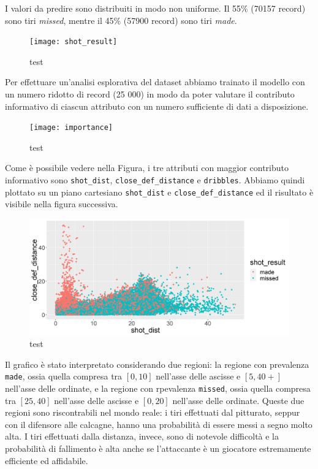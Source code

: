 \par
I valori da predire sono distribuiti in modo non uniforme. Il 55\% (70157 record) sono tiri \textit{missed}, mentre il 45\% (57900 record) sono tiri \textit{made}.

\begin{figure}
\caption{test}
\fontsize{9pt}{1em}
	\texttt{[image: shot\_result]}
\end{figure}

\par
Per effettuare un'analisi esplorativa del dataset abbiamo trainato il modello con un numero ridotto di record (25 000) in modo da poter valutare il contributo informativo di ciascun attributo con un numero sufficiente di dati a disposizione.

\begin{figure}
\caption{test}
\fontsize{9pt}{1em}
	\texttt{[image: importance]}
\end{figure}

\par
Come è possibile vedere nella Figura, i tre attributi con maggior contributo informativo sono \texttt{shot\_dist}, \texttt{close\_def\_distance} e \texttt{dribbles}. Abbiamo quindi plottato su un piano cartesiano \texttt{shot\_dist} e \texttt{close\_def\_distance} ed il risultato è visibile nella figura successiva.

\begin{figure}
\caption{test}
\fontsize{9pt}{1em}
	\includegraphics[width=\linewidth]{plot_shot_dist_def.png}
\end{figure}

Il grafico è stato interpretato considerando due regioni: la regione con prevalenza \texttt{made}, ossia quella compresa tra $[0, 10]$ nell'asse delle ascisse e $[5, 40+] $ nell'asse delle ordinate, e la regione con rpevalenza \texttt{missed}, ossia quella compresa tra $[25, 40]$ nell'asse delle ascisse e $[0, 20] $ nell'asse delle ordinate.
Queste due regioni sono riscontrabili nel mondo reale: i tiri effettuati dal pitturato, seppur con il difensore alle calcagne, hanno una probabilità di essere messi a segno molto alta. I tiri effettuati dalla distanza, invece, sono di notevole difficoltà e la probabilità di fallimento è alta anche se l'attaccante è un giocatore estremamente efficiente ed affidabile.

